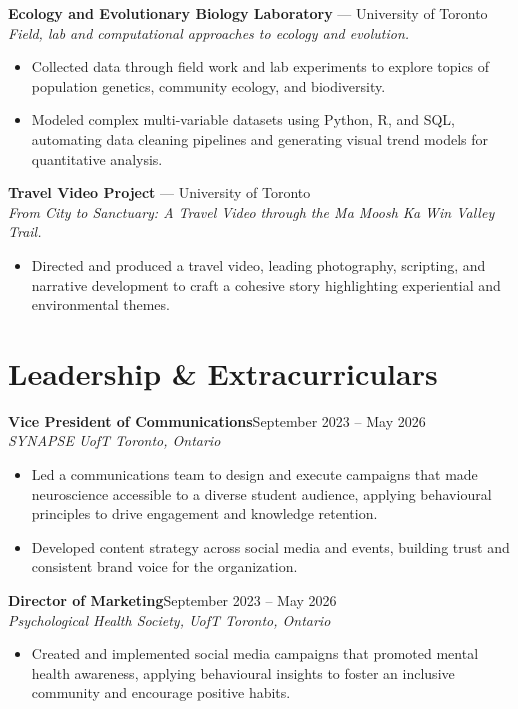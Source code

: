 \documentclass[10pt]{article}
\newcommand{\role}[4]{%
  \noindent\textbf{#1}\hfill{\small\color{graytext}#4}\\
  {\itshape\small #2 \hfill #3}\par\vspace{2pt}
}
\begin{document}
\vspace{2pt}
\textbf{Ecology and Evolutionary Biology Laboratory} --- University of Toronto\\
{\small\itshape Field, lab and computational approaches to ecology and evolution.}
\begin{itemize}
  \item Collected data through field work and lab experiments to explore topics of population genetics, community ecology, and biodiversity.
  \item Modeled complex multi-variable datasets using Python, R, and SQL, automating data cleaning pipelines and generating visual trend models for quantitative analysis.
\end{itemize}

\vspace{2pt}
\textbf{Travel Video Project} --- University of Toronto\\
{\small\itshape From City to Sanctuary: A Travel Video through the Ma Moosh Ka Win Valley Trail.}
\begin{itemize}
  \item Directed and produced a travel video, leading photography, scripting, and narrative development to craft a cohesive story highlighting experiential and environmental themes.
\end{itemize}

\section*{Leadership \& Extracurriculars}

\role{Vice President of Communications}{SYNAPSE UofT}{Toronto, Ontario}{September 2023 -- May 2026}
\begin{itemize}
  \item Led a communications team to design and execute campaigns that made neuroscience accessible to a diverse student audience, applying behavioural principles to drive engagement and knowledge retention.
  \item Developed content strategy across social media and events, building trust and consistent brand voice for the organization.
\end{itemize}

\vspace{2pt}
\role{Director of Marketing}{Psychological Health Society, UofT}{Toronto, Ontario}{September 2023 -- May 2026}
\begin{itemize}
  \item Created and implemented social media campaigns that promoted mental health awareness, applying behavioural insights to foster an inclusive community and encourage positive habits.
\end{itemize}
\end{document}
